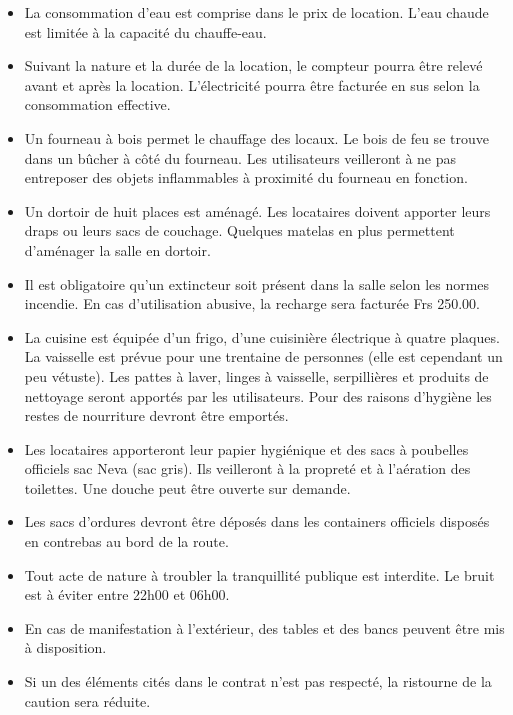 \documentclass[a4paper,12pt]{extarticle}
\begin{document}
\begin{itemize}
\item La consommation d'eau est comprise dans le prix de location.
L'eau chaude est limitée à la capacité du chauffe-eau.

\item Suivant la nature et la durée de la location, le compteur pourra être relevé avant et après la location.
L'électricité pourra être facturée en sus selon la consommation effective.

\item Un fourneau à bois permet le chauffage des locaux. Le bois de feu se trouve dans un bûcher à côté du fourneau.
Les utilisateurs veilleront à ne pas entreposer des objets inflammables à proximité du fourneau en fonction.

\item Un dortoir de huit places est aménagé. Les locataires doivent apporter leurs draps
ou leurs sacs de couchage. Quelques matelas en plus permettent d'aménager la salle
en dortoir.

\item Il est obligatoire qu'un extincteur soit présent dans la salle selon les normes incendie.
En cas d'utilisation abusive, la recharge sera facturée Frs 250.00.

\item La cuisine est équipée d'un frigo, d'une cuisinière électrique à quatre plaques.
La vaisselle est prévue pour une trentaine de personnes (elle est cependant un peu vétuste).
Les pattes à laver, linges à vaisselle, serpillières et produits de nettoyage seront apportés par les utilisateurs.
Pour des raisons d'hygiène les restes de nourriture devront être emportés.

\item Les locataires apporteront leur papier hygiénique et des sacs à poubelles officiels sac Neva (sac gris).
Ils veilleront à la propreté et à l'aération des toilettes.
Une douche peut être ouverte sur demande.

\item Les sacs d'ordures devront être déposés dans les containers officiels disposés en contrebas au bord de la route.

\item Tout acte de nature à troubler la tranquillité publique est interdite. Le bruit est à éviter entre 22h00 et 06h00.

\item En cas de manifestation à l'extérieur, des tables et des bancs peuvent être mis à disposition.

\item Si un des éléments cités dans le contrat n'est pas respecté, la ristourne de la caution sera réduite.
\end{itemize}
\end{document}
